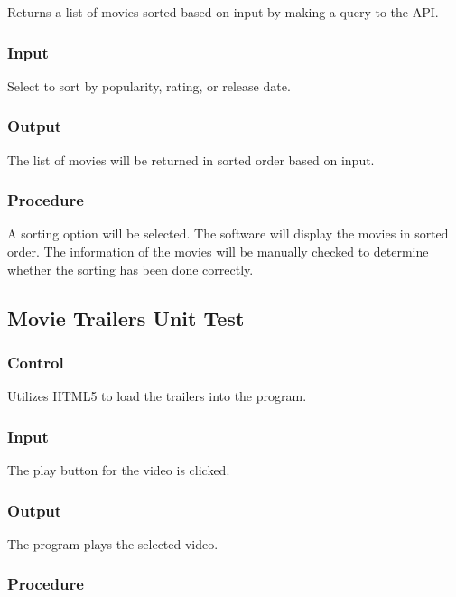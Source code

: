 \documentclass[12pt, titlepage]{article}
\begin{document}
Returns a list of movies sorted based on input by making a query to the API. 

\subsubsection{Input}

Select to sort by popularity, rating, or release date. 

\subsubsection{Output}

The list of movies will be returned in sorted order based on input. 

\subsubsection{Procedure}

A sorting option will be selected. The software will display the movies in sorted order. The information of the movies will be manually checked to determine whether the sorting has been done correctly. 

\subsection{Movie Trailers Unit Test}
\subsubsection{Control}

Utilizes HTML5 to load the trailers into the program.  

\subsubsection{Input}

The play button for the video is clicked.

\subsubsection{Output}

The program plays the selected video.

\subsubsection{Procedure}
\end{document}
